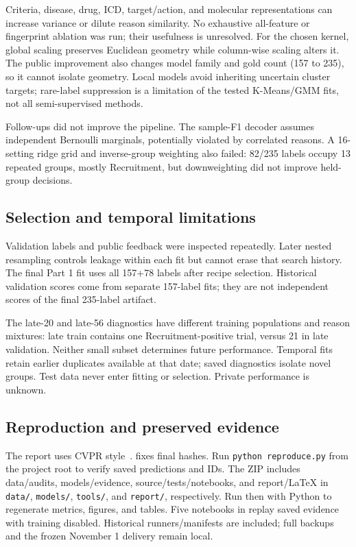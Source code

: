 Criteria, disease, drug, ICD, target/action, and molecular representations can increase variance
or dilute reason similarity. No exhaustive all-feature or fingerprint ablation was run;
their usefulness is unresolved.
For the chosen kernel, global scaling preserves Euclidean geometry while column-wise scaling
alters it. The public improvement also changes model family and gold count (157 to 235),
so it cannot isolate geometry. Local models avoid inheriting uncertain cluster targets;
rare-label suppression is a limitation of the tested K-Means/GMM fits, not all semi-supervised methods.

Follow-ups did not improve the pipeline. The sample-F1 decoder assumes independent Bernoulli
marginals, potentially violated by correlated reasons. A 16-setting ridge grid and inverse-group
weighting also failed: 82/235 labels occupy 13 repeated groups, mostly Recruitment,
but downweighting did not improve held-group decisions.

\subsection{Selection and temporal limitations}
Validation labels and public feedback were inspected repeatedly. Later nested resampling
controls leakage within each fit but cannot erase that search history. The final Part 1 fit
uses all 157+78 labels after recipe selection. Historical validation scores come from separate
157-label fits; they are not independent scores of the final 235-label artifact.

The late-20 and late-56 diagnostics have different training populations and reason mixtures:
late train contains one Recruitment-positive trial, versus 21 in late validation. Neither
small subset determines future performance. Temporal fits retain earlier duplicates available at that date; saved diagnostics
isolate novel groups. Test data never enter fitting or selection. Private performance is unknown.

\subsection{Reproduction and preserved evidence}
The report uses CVPR style~\cite{template}.  fixes final hashes.
Run \texttt{python reproduce.py} from the project root to verify saved predictions and IDs.
The ZIP includes data/audits, models/evidence, source/tests/notebooks, and report/LaTeX in
\texttt{data/}, \texttt{models/}, \texttt{tools/}, and \texttt{report/}, respectively.
Run  then 
with Python to regenerate metrics, figures, and tables. Five notebooks in 
replay saved evidence with training disabled. Historical runners/manifests are included;
full backups and the frozen November 1 delivery remain local.

